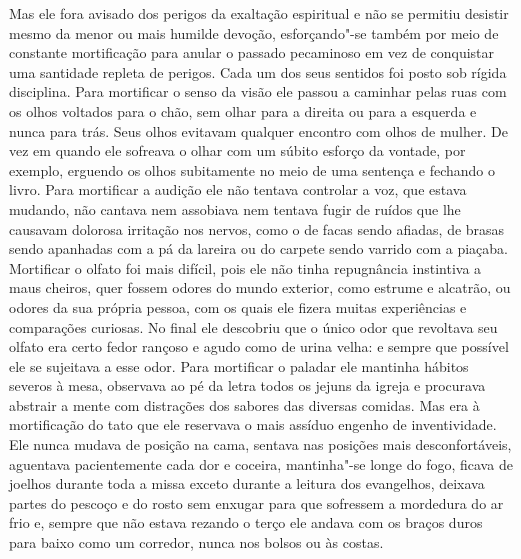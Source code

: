 Mas ele fora avisado dos perigos da exaltação espiritual e não se
permitiu desistir mesmo da menor ou mais humilde devoção, esforçando"-se
também por meio de constante mortificação para anular o passado
pecaminoso em vez de conquistar uma santidade repleta de perigos. Cada
um dos seus sentidos foi posto sob rígida disciplina. Para mortificar o
senso da visão ele passou a caminhar pelas ruas com os olhos voltados
para o chão, sem olhar para a direita ou para a esquerda e nunca para
trás. Seus olhos evitavam qualquer encontro com olhos de mulher. De vez
em quando ele sofreava o olhar com um súbito esforço da vontade, por
exemplo, erguendo os olhos subitamente no meio de uma sentença e
fechando o livro.  Para mortificar a audição ele não tentava controlar
a voz, que estava mudando, não cantava nem assobiava nem tentava fugir
de ruídos que lhe causavam dolorosa irritação nos nervos, como o de
facas sendo afiadas, de brasas sendo apanhadas com a pá da lareira ou
do carpete sendo varrido com a piaçaba. 
Mortificar o olfato foi mais difícil, pois ele não tinha repugnância
instintiva a maus cheiros, quer fossem odores do mundo exterior, como
estrume e alcatrão, ou odores da sua própria pessoa, com os quais ele
fizera muitas experiências e comparações curiosas. No final ele
descobriu que o único odor que revoltava seu olfato era certo fedor
rançoso e agudo como de urina velha: e sempre que possível ele se
sujeitava a esse odor. Para mortificar o paladar ele mantinha hábitos
severos à mesa, observava ao pé da letra todos os jejuns da igreja e
procurava abstrair a mente com distrações dos sabores das diversas
comidas. Mas era à mortificação do tato que ele reservava o mais
assíduo engenho de inventividade. Ele nunca mudava de posição na cama,
sentava nas posições mais desconfortáveis, aguentava pacientemente cada
dor e coceira, mantinha"-se longe do fogo, ficava de joelhos durante
toda a missa exceto durante a leitura dos evangelhos, deixava partes do
pescoço e do rosto sem enxugar para que sofressem a mordedura do ar
frio e, sempre que não estava rezando o terço ele andava com os braços
duros para baixo como um corredor, nunca nos bolsos ou às costas.

